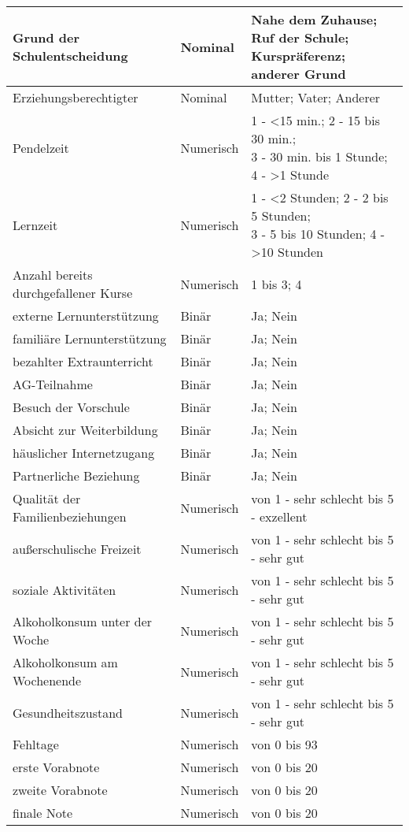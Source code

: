\begin{table}[!ht]
\begin{tabular}{lll}
        Grund der Schulentscheidung & Nominal & \makecell[l]{Nahe dem Zuhause; Ruf der Schule; \\Kurspräferenz; anderer Grund }\\  \hline
        Erziehungsberechtigter & Nominal & Mutter; Vater; Anderer \\  \hline
        Pendelzeit & Numerisch & \makecell[l]{1 - <15 min.; 2 - 15 bis 30 min.; \\3 - 30 min. bis 1 Stunde; 4 - >1 Stunde} \\  \hline
        Lernzeit & Numerisch & \makecell[l]{1 - <2 Stunden; 2 - 2 bis 5 Stunden; \\3 - 5 bis 10 Stunden; 4 - >10 Stunden }\\  \hline
        Anzahl bereits durchgefallener Kurse & Numerisch & 1 bis 3; 4 \\  \hline
        externe Lernunterstützung & Binär & Ja; Nein \\  \hline
        familiäre Lernunterstützung & Binär & Ja; Nein \\  \hline
        bezahlter Extraunterricht & Binär & Ja; Nein \\  \hline
        AG-Teilnahme & Binär & Ja; Nein \\  \hline
        Besuch der Vorschule & Binär & Ja; Nein \\  \hline
        Absicht zur Weiterbildung & Binär & Ja; Nein \\ \hline
        häuslicher Internetzugang & Binär & Ja; Nein \\ \hline
        Partnerliche Beziehung & Binär & Ja; Nein \\ \hline
        Qualität der Familienbeziehungen & Numerisch & von 1 - sehr schlecht bis 5 - exzellent\\ \hline
        außerschulische Freizeit & Numerisch & von 1 - sehr schlecht bis 5 - sehr gut \\ \hline
        soziale Aktivitäten & Numerisch & von 1 - sehr schlecht bis 5 - sehr gut \\ \hline
        Alkoholkonsum unter der Woche & Numerisch & von 1 - sehr schlecht bis 5 - sehr gut \\ \hline
        Alkoholkonsum am Wochenende & Numerisch & von 1 - sehr schlecht bis 5 - sehr gut \\ \hline
        Gesundheitszustand & Numerisch & von 1 - sehr schlecht bis 5 - sehr gut\\ \hline
        Fehltage & Numerisch & von 0 bis 93 \\ \hline
        erste Vorabnote & Numerisch & von 0 bis 20 \\ \hline
        zweite Vorabnote & Numerisch & von 0 bis 20 \\ \hline
        finale Note & Numerisch & von 0 bis 20 \\ \hline
    \hline
    \end{tabular}
\end{table}

